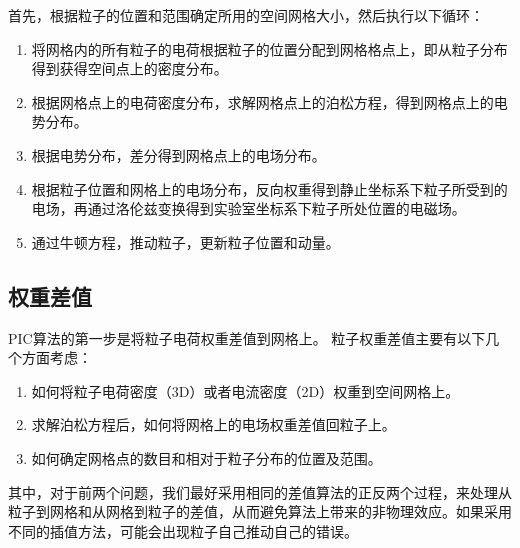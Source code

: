 首先，根据粒子的位置和范围确定所用的空间网格大小，然后执行以下循环：
\begin{enumerate}
  \item 将网格内的所有粒子的电荷根据粒子的位置分配到网格格点上，即从粒子分布得到获得空间点上的密度分布。
  \item 根据网格点上的电荷密度分布，求解网格点上的泊松方程，得到网格点上的电势分布。
  \item 根据电势分布，差分得到网格点上的电场分布。
  \item 根据粒子位置和网格上的电场分布，反向权重得到静止坐标系下粒子所受到的电场，再通过洛伦兹变换得到实验室坐标系下粒子所处位置的电磁场。
  \item 通过牛顿方程，推动粒子，更新粒子位置和动量。
\end{enumerate}

\subsection{权重差值}
PIC算法的第一步是将粒子电荷权重差值到网格上。
粒子权重差值主要有以下几个方面考虑：

\begin{enumerate}
  \item 如何将粒子电荷密度（3D）或者电流密度（2D）权重到空间网格上。
  \item 求解泊松方程后，如何将网格上的电场权重差值回粒子上。
  \item 如何确定网格点的数目和相对于粒子分布的位置及范围。
\end{enumerate}

其中，对于前两个问题，我们最好采用相同的差值算法的正反两个过程，来处理从粒子到网格和从网格到粒子的差值，从而避免算法上带来的非物理效应。如果采用不同的插值方法，可能会出现粒子自己推动自己的错误。

